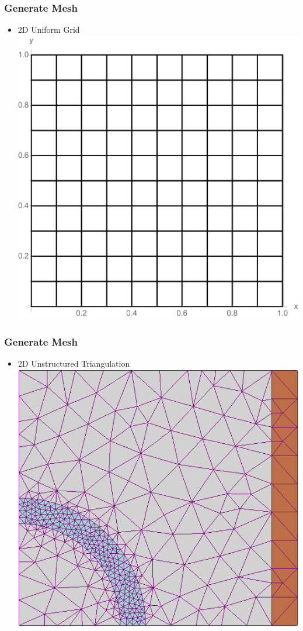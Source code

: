 \documentclass[10pt]{beamer}
\begin{document}
  \begin{frame}
    \frametitle{Generate Mesh}
    \begin{itemize}
      \item 2D Uniform Grid \hfill \\
          \includegraphics[scale=0.27]{Figures/2Dgrid}
    \end{itemize}
  \end{frame}

  \begin{frame}
    \frametitle{Generate Mesh}
    \begin{itemize}
      \item 2D Unstructured Triangulation
          \includegraphics[scale=0.4]{Figures/2Dmesh}
    \end{itemize}
  \end{frame}
\end{document}
